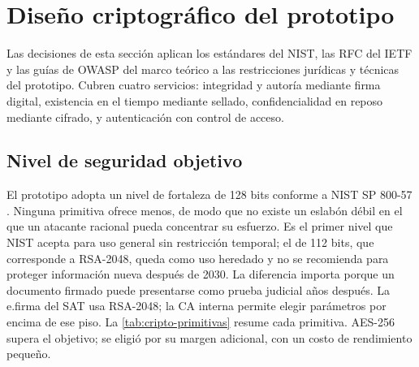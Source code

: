 \section{Diseño criptográfico del prototipo}\label{sec:diseno-cripto}

Las decisiones de esta sección aplican los estándares del NIST, las RFC del IETF y las guías de OWASP del marco teórico a las restricciones jurídicas y técnicas del prototipo. Cubren cuatro servicios: integridad y autoría mediante firma digital, existencia en el tiempo mediante sellado, confidencialidad en reposo mediante cifrado, y autenticación con control de acceso.

\subsection{Nivel de seguridad objetivo}\label{sec:nivel-seguridad}

El prototipo adopta un nivel de fortaleza de 128 bits conforme a NIST SP 800-57 \cite{barker2020}. Ninguna primitiva ofrece menos, de modo que no existe un eslabón débil en el que un atacante racional pueda concentrar su esfuerzo. Es el primer nivel que NIST acepta para uso general sin restricción temporal; el de 112 bits, que corresponde a RSA-2048, queda como uso heredado y no se recomienda para proteger información nueva después de 2030. La diferencia importa porque un documento firmado puede presentarse como prueba judicial años después. La e.firma del SAT usa RSA-2048; la CA interna permite elegir parámetros por encima de ese piso. La \cref{tab:cripto-primitivas} resume cada primitiva. AES-256 supera el objetivo; se eligió por su margen adicional, con un costo de rendimiento pequeño.

